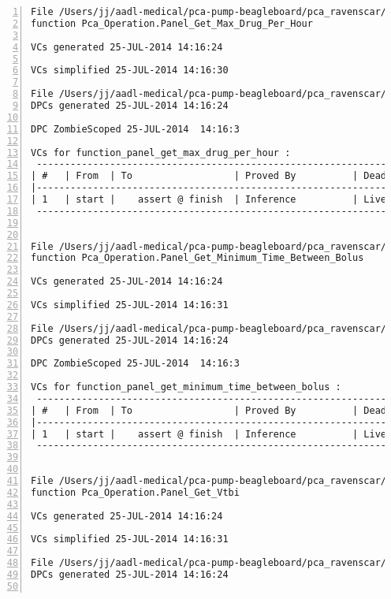 \begin{lstlisting}[gobble=0, numbers=left, caption={POGS report for PCA Pump prototype}, label={listing:pca_ravenscar:pogs_full}]
File /Users/jj/aadl-medical/pca-pump-beagleboard/pca_ravenscar/pca_operation/panel_get_max_drug_per_hour.vcg
function Pca_Operation.Panel_Get_Max_Drug_Per_Hour

VCs generated 25-JUL-2014 14:16:24

VCs simplified 25-JUL-2014 14:16:30

File /Users/jj/aadl-medical/pca-pump-beagleboard/pca_ravenscar/pca_operation/panel_get_max_drug_per_hour.dpc
DPCs generated 25-JUL-2014 14:16:24

DPC ZombieScoped 25-JUL-2014  14:16:3

VCs for function_panel_get_max_drug_per_hour :
 -----------------------------------------------------------------------------
| #   | From  | To                  | Proved By          | Dead Path | Status |
|-----------------------------------------------------------------------------
| 1   | start |    assert @ finish  | Inference          | Live      |   IL   |
 -----------------------------------------------------------------------------


File /Users/jj/aadl-medical/pca-pump-beagleboard/pca_ravenscar/pca_operation/panel_get_minimum_time_between_bolus.vcg
function Pca_Operation.Panel_Get_Minimum_Time_Between_Bolus

VCs generated 25-JUL-2014 14:16:24

VCs simplified 25-JUL-2014 14:16:31

File /Users/jj/aadl-medical/pca-pump-beagleboard/pca_ravenscar/pca_operation/panel_get_minimum_time_between_bolus.dpc
DPCs generated 25-JUL-2014 14:16:24

DPC ZombieScoped 25-JUL-2014  14:16:3

VCs for function_panel_get_minimum_time_between_bolus :
 -----------------------------------------------------------------------------
| #   | From  | To                  | Proved By          | Dead Path | Status |
|-----------------------------------------------------------------------------
| 1   | start |    assert @ finish  | Inference          | Live      |   IL   |
 -----------------------------------------------------------------------------


File /Users/jj/aadl-medical/pca-pump-beagleboard/pca_ravenscar/pca_operation/panel_get_vtbi.vcg
function Pca_Operation.Panel_Get_Vtbi

VCs generated 25-JUL-2014 14:16:24

VCs simplified 25-JUL-2014 14:16:31

File /Users/jj/aadl-medical/pca-pump-beagleboard/pca_ravenscar/pca_operation/panel_get_vtbi.dpc
DPCs generated 25-JUL-2014 14:16:24


\end{lstlisting}
